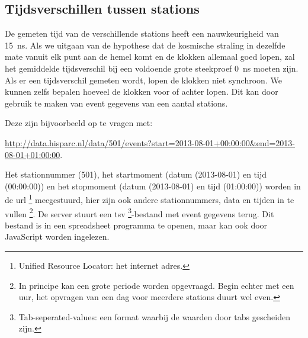 \subsection{Tijdsverschillen tussen stations}

De gemeten tijd van de verschillende stations heeft een nauwkeurigheid
van \SI{15}{\nano\second}. Als we uitgaan van de hypothese dat de
kosmische straling in dezelfde mate vanuit elk punt aan de hemel
komt en de klokken allemaal goed lopen, zal het gemiddelde tijdsverschil
bij een voldoende grote steekproef \SI{0}{\nano\second} moeten zijn.
Als er een tijdsverschil gemeten wordt, lopen de klokken niet synchroon.
We kunnen zelfs bepalen hoeveel de klokken voor of achter lopen. Dit
kan door gebruik te maken van event gegevens van een aantal stations.

Deze zijn bijvoorbeeld op te vragen met:

\url{http://data.hisparc.nl/data/501/events?start=2013-08-01+00:00:00&end=2013-08-01+01:00:00}.

Het stationnummer (501), het startmoment (datum (2013-08-01) en tijd
(00:00:00)) en het stopmoment (datum (2013-08-01) en tijd (01:00:00))
worden in de url%
\footnote{Unified Resource Locator: het internet adres.%
} meegestuurd, hier zijn ook andere stationnummers, data en tijden
in te vullen%
\footnote{In principe kan een grote periode worden opgevraagd. Begin echter
met een uur, het opvragen van een dag voor meerdere stations duurt
wel even.%
}. De server stuurt een tsv%
\footnote{Tab-seperated-values: een format waarbij de waarden door tabs gescheiden zijn.%
}-bestand met event gegevens terug. Dit bestand is in een spreadsheet
programma te openen, maar kan ook door JavaScript worden ingelezen.

